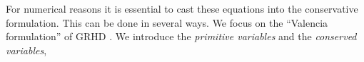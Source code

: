 For numerical reasons it is essential to cast these equations into 
the conservative formulation. This can be done in several ways. We focus on the ``Valencia formulation'' of 
\ac{GRHD} \citep{Banyuls:1997}. 
%
We introduce the \textit{primitive variables} and the \textit{conserved variables},

